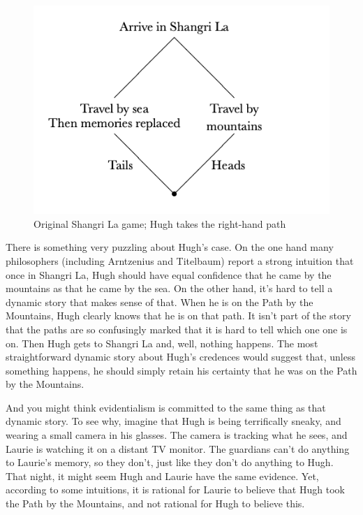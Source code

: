 \documentclass[
  10pt,
  letterpaper,
  DIV=11,
  numbers=noendperiod,
  twoside]{scrartcl}
\begin{document}
\begin{figure}[H]

{\centering \includegraphics{images/mbt-fig1.png}

}

\caption{Original Shangri La game; Hugh takes the right-hand path}

\end{figure}%

There is something very puzzling about Hugh's case. On the one hand many
philosophers (including Arntzenius and Titelbaum) report a strong
intuition that once in Shangri La, Hugh should have equal confidence
that he came by the mountains as that he came by the sea. On the other
hand, it's hard to tell a dynamic story that makes sense of that. When
he is on the Path by the Mountains, Hugh clearly knows that he is on
that path. It isn't part of the story that the paths are so confusingly
marked that it is hard to tell which one one is on. Then Hugh gets to
Shangri La and, well, nothing happens. The most straightforward dynamic
story about Hugh's credences would suggest that, unless something
happens, he should simply retain his certainty that he was on the Path
by the Mountains.

And you might think evidentialism is committed to the same thing as that
dynamic story. To see why, imagine that Hugh is being terrifically
sneaky, and wearing a small camera in his glasses. The camera is
tracking what he sees, and Laurie is watching it on a distant TV
monitor. The guardians can't do anything to Laurie's memory, so they
don't, just like they don't do anything to Hugh. That night, it might
seem Hugh and Laurie have the same evidence. Yet, according to some
intuitions, it is rational for Laurie to believe that Hugh took the Path
by the Mountains, and not rational for Hugh to believe this.
\end{document}
